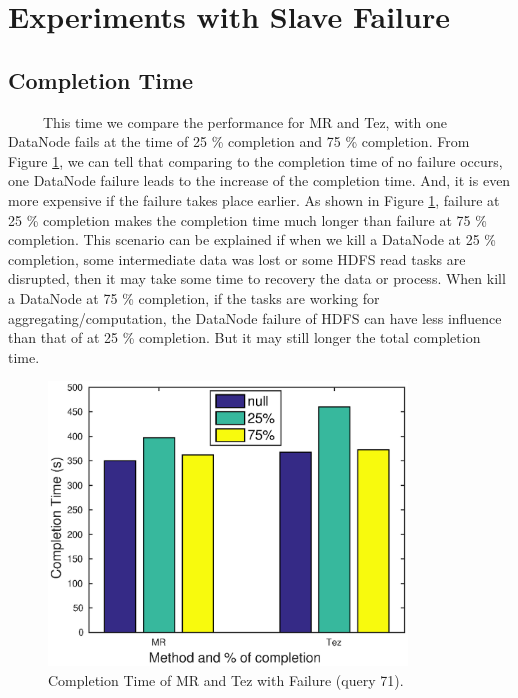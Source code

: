 \documentclass[10pt]{article}
\begin{document}


\section{Experiments with Slave Failure}
\subsection{Completion Time}

~~~~~This time we compare the performance for MR and Tez, with one DataNode fails at the time of 25 \% completion and 75 \% completion. From Figure \ref{fig:q3a_time}, we can tell that comparing to the completion time of no failure occurs, one DataNode failure leads to the increase of the completion time. And, it is even more expensive if the failure takes place earlier. As shown in Figure \ref{fig:q3a_time}, failure at 25 \% completion makes the completion time much longer than failure at 75 \% completion. This scenario can be explained if when we kill a DataNode at 25 \% completion, some intermediate data was lost or some HDFS read tasks are disrupted, then it may take some time to recovery the data or process. When kill a DataNode at 75 \% completion, if the tasks are working for aggregating/computation, the DataNode failure of HDFS can have less influence than that of at 25 \% completion. But it may still longer the total completion time.


\begin{figure}
\begin{center}
\includegraphics[width=0.85\textwidth]{pic/q3a_time}
\caption{Completion Time of MR and Tez with Failure (query 71).}
\label{fig:q3a_time}
\end{center}
\end{figure}



%

%

\end{document}
